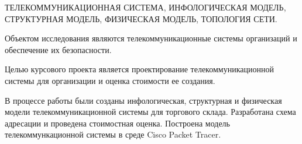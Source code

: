 
\info

ТЕЛЕКОММУНИКАЦИОННАЯ СИСТЕМА, ИНФОЛОГИЧЕСКАЯ МОДЕЛЬ, СТРУКТУРНАЯ МОДЕЛЬ, ФИЗИЧЕСКАЯ МОДЕЛЬ, ТОПОЛОГИЯ СЕТИ.

Объектом исследования являются телекоммуникационные системы организаций и обеспечение их безопасности.

Целью курсового проекта является проектирование телекоммуникационной системы для организации и оценка стоимости ее создания. 

В процессе работы были созданы инфологическая, структурная и физическая модели телекоммуникационной системы для торгового склада. Разработана схема адресации и проведена стоимостная оценка. Построена модель телекоммункационной системы в среде Cisco Packet Tracer.

